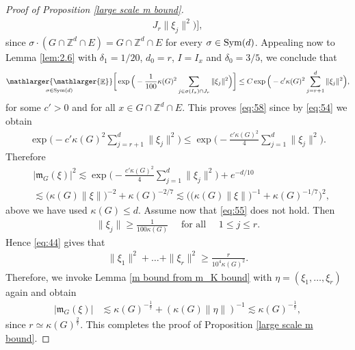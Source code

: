 \documentclass[a4paper,oneside, reqno]{amsart}
\numberwithin{equation}{section}
\theoremstyle{definition}%
\theoremstyle{definition}
\theoremstyle{definition}%
\theoremstyle{definition}
\newcommand{\E}{\mathop{\mathbb{E}}}
\newcommand{\Z}{\mathbb{Z}}
\DeclareMathOperator{\Sym}{Sym}
\newcommand{\se}[1]{\underset{_{\substack{#1}}}{\mathlarger{\mathlarger{\E}}}}
\begin{document}
\begin{proof}[Proof of Proposition \ref{large scale m bound}]
\begin{align*}
{  J_r}\|\xi_j\|^2\Big)\bigg],
\end{align*}
since $\sigma\cdot (G\cap\Z^d\cap E)=G\cap\Z^d\cap E$ for every $\sigma\in{\rm Sym}(d)$. 
Appealing now to  Lemma \ref{lem:2.6} with $\delta_1=1/20$, $d_0=r$, $I=I_x$ and $\delta_0=3/5$, we conclude that
\begin{align*}
\se{\sigma \in \Sym(d)}\bigg[\exp\Big(-\frac{1}{100}\kappa(G)^2\sum_{j\in \sigma(I_x)\cap
  J_r}\|\xi_j\|^2\Big)\bigg]\le C\exp\Big(-c'\kappa(G)^2\sum_{j=r+1}^d\|\xi_j\|^2\Big),
  \end{align*}
  for some $c'>0$ and for all $x\in G\cap\Z^d\cap E$.
  This proves \eqref{eq:58} since by
\eqref{eq:54} we obtain
\begin{align*}
\exp\Big(-c'\kappa(G)^2\sum_{j=r+1}^d\|\xi_j\|^2\Big)\le \exp\Big(-\frac{c'\kappa(G)^2}{4}\sum_{j=1}^d\|\xi_j\|^2\Big).
\end{align*}
Therefore
\begin{align*}
&|\mathfrak{m}_G(\xi)|^2 \lesssim \exp\Big(-\frac{c'\kappa(G)^2}{4}\sum_{j=1}^d\|\xi_j\|^2\Big)+ e^{-d/10} \\
&\lesssim \Big( \kappa(G) \|\xi \| \Big)^{-2} + \kappa(G)^{-2/7} \lesssim \bigg( \Big( \kappa(G) \|\xi \| \Big)^{-1} + \kappa(G)^{-1/7} \bigg)^{2},
\end{align*}
above we have used $\kappa(G) \le d$.
Assume now that \eqref{eq:55} does not hold. Then
\begin{align}
\label{eq:44}
  \|\xi_j\|\ge\frac{1}{100\kappa(G)}\quad\text{ for all
  } \quad 1\le j\le r.
\end{align}
Hence \eqref{eq:44} gives that
\begin{align*}
  \|\xi_1\|^2+\ldots+\|\xi_r\|^2\ge\frac{r}{10^4\kappa(G)^2}.
\end{align*}
Therefore, we invoke Lemma \ref{m bound from m_K bound} with $\eta=(\xi_1,\ldots, \xi_r)$ again and obtain 
\begin{align*}
  |\mathfrak {m}_G(\xi)|&\lesssim\kappa(G)^{-\frac{1}{7}}+(\kappa(G)\|\eta\|)^{-1} \lesssim \kappa(G)^{-\frac{1}{7}},
\end{align*}
since $r\simeq\kappa(G)^{\frac{2}{7}}$. This completes the proof of Proposition \ref{large scale m bound}.
\end{proof}
\end{document}
